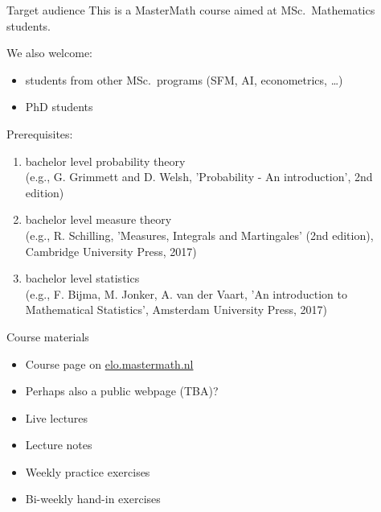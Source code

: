 \begin{frame}{Target audience}
  This is a MasterMath course aimed at MSc.\ Mathematics students.

  \bigskip
  We also welcome:
  \begin{itemize}
    \item students from other MSc.\ programs (SFM, AI, econometrics, \dots)
    \item PhD students
  \end{itemize}
  
  \bigskip
  Prerequisites:
  \begin{enumerate}
    \item bachelor level probability theory\\
      {\tiny(e.g., G. Grimmett and D. Welsh, 'Probability - An introduction', 2nd edition)}
\item bachelor level measure theory\\
  {\tiny(e.g., R. Schilling, 'Measures, Integrals and Martingales' (2nd edition), Cambridge University Press, 2017)}
\item bachelor level statistics\\
  {\tiny(e.g., F. Bijma, M. Jonker, A. van der Vaart, 'An introduction to Mathematical Statistics', Amsterdam University Press, 2017)}
  \end{enumerate}
\end{frame}

\begin{frame}{Course materials}
  \begin{itemize}
    \item Course page on \url{elo.mastermath.nl} 
    \item Perhaps also a public webpage (TBA)?
    \item Live lectures
    \item Lecture notes
    \item Weekly practice exercises
    \item Bi-weekly hand-in exercises
  \end{itemize}
\end{frame}

